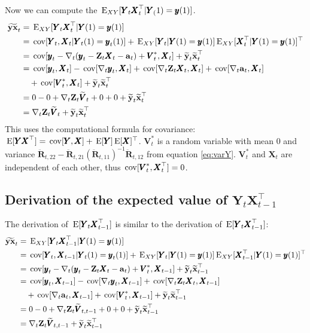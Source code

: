 \documentclass[]{article}
\def\ZZ{\mbox{$\mathbf Z$}}	\def\zz{\mbox{$\mathbf z$}}
\def\RR{\mbox{$\mathbf R$}}	 \def\rr{\mbox{$\mathbf r$}}
\def\VV{\mbox{$\pmb{V}$}}	\def\vv{\mbox{$\pmb{v}$}}
\def\XX{\mbox{$\pmb{X}$}}	\def\xx{\mbox{$\pmb{x}$}}
\def\YY{\mbox{$\pmb{Y}$}}	\def\yy{\mbox{$\pmb{y}$}}
\def\E{\,\textup{\textrm{E}}}
\def\cov{\,\textup{\textrm{cov}}}
\def\hatxt{\widetilde{\mbox{$\mathbf x$}}_t}
\def\hatxtm{\widetilde{\mbox{$\mathbf x$}}_{t-1}}
\def\hatyt{\widetilde{\mbox{$\mathbf y$}}_t}
\def\hatYXt{\widetilde{\mbox{$\mathbf{y}\mathbf{x}$}}_t}
\def\hatVt{\widetilde{\VV}_t}
\def\hatVttm{\widetilde{\VV}_{t,t-1}}
\def\IR{\nabla}
\begin{document}
Now we can compute the $\E_{XY}[\YY_t\XX_t^\top|\YY_(1)=\yy(1)]$.  
\begin{equation}
\begin{split}
\hatYXt&=\E_{XY}[\YY_t\XX_t^\top|\YY(1)=\yy(1)]\\
&=\cov[\YY_t,\XX_t|\YY_t(1)=\yy_t(1)]+\E_{XY}[\YY_t|\YY(1)=\yy(1)]\E_{XY}[\XX_t^\top|\YY(1)=\yy(1)]^\top\\
&=\cov[\yy_t-\IR_t(\yy_t-\ZZ_t\XX_t-\aa_t)+\VV^*_t,\XX_t]+\hatyt\hatxt^\top \\
&=\cov[\yy_t,\XX_t]-\cov[\IR_t\yy_t,\XX_t]+\cov[\IR_t\ZZ_t\XX_t,\XX_t] +\cov[\IR_t\aa_t,\XX_t]\\
&\quad + \cov[\VV^*_t,\XX_t]+\hatyt\hatxt^\top \\
&=0 - 0 + \IR_t\ZZ_t\hatVt + 0 + 0 + \hatyt\hatxt^\top \\
&= \IR_t\ZZ_t\hatVt + \hatyt\hatxt^\top
\end{split}
\end{equation}
This uses the computational formula for covariance: $\E[\YY\XX^\top]=\cov[\YY,\XX]+\E[\YY]\E[\XX]^\top$. $\VV^*_t$ is a random variable with mean 0 and variance $\ddot{\RR}_{t,22} - \ddot{\RR}_{t,21}(\ddot{\RR}_{t,11})^{-1}\ddot{\RR}_{t,12}$ from equation \ref{eq:varY}.  $\VV^*_t$ and $\XX_t$ are independent of each other, thus $\cov[\VV^*_t,\XX_t^\top]=0$.

\subsection{Derivation of the expected value of $\YY_t\XX_{t-1}^\top$}
The derivation of $\E[\YY_t\XX_{t-1}^\top]$ is similar to the derivation of $\E[\YY_t\XX_{t-1}^\top]$:
\begin{equation}
\begin{split}
\hatYXt&=\E_{XY}[\YY_t\XX_{t-1}^\top|\YY(1)=\yy(1)]\\
&=\cov[\YY_t,\XX_{t-1}|\YY_t(1)=\yy_t(1)] + \E_{XY}[\YY_t|\YY(1)=\yy(1)]\E_{XY}[\XX_{t-1}^\top|\YY(1)=\yy(1)]^\top\\
&=\cov[\yy_t-\IR_t(\yy_t-\ZZ_t\XX_t-\aa_t)+\VV^*_t,\XX_{t-1}]+\hatyt\hatxtm^\top \\
&=\cov[\yy_t,\XX_{t-1}]-\cov[\IR_t\yy_t,\XX_{t-1}]+\cov[\IR_t\ZZ_t\XX_t,\XX_{t-1}] \\
&\quad +\cov[\IR_t\aa_t,\XX_{t-1}] + \cov[\VV^*_t,\XX_{t-1}]+\hatyt\hatxtm^\top \\
&=0 - 0 + \IR_t\ZZ_t\hatVttm + 0 + 0 + \hatyt\hatxtm^\top \\
&= \IR_t\ZZ_t\hatVttm + \hatyt\hatxtm^\top
\end{split}
\end{equation}
\end{document}
